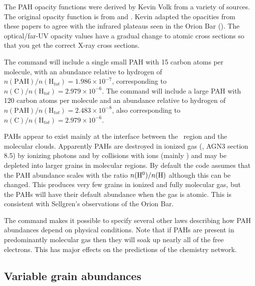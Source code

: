 The PAH opacity functions were derived by Kevin Volk
from a variety of sources.
The original opacity function is from \citet{Desert1990} and
\citet{Schutte1993}.
Kevin adapted the
opacities from these papers to agree with the infrared plateaus seen in
the Orion Bar (\citealp{Bregman1989}).
The optical/far-UV opacity values
have a gradual change to atomic cross sections so that you get the correct
X-ray cross sections.

The command  will include a
single small PAH with 15 carbon
atoms per molecule, with an abundance relative to hydrogen of
$n(
{{\mathrm{PAH}}})/n( {{\mathrm{H}}_{tot} } ) = 1.986 \times 10^{
- 7} $,
corresponding to
$n( {\mathrm{C}})/n( {{\mathrm{H}}_{tot}
} ) = 2.979 \times 10^{ - 6} $.
The command  will include
a large PAH with 120 carbon
atoms per molecule and an abundance relative to hydrogen of
$n(
{{\mathrm{PAH}}} )/n( {{\mathrm{H}}_{tot} } ) = 2.483 \times 10^{
- 8} $, also corresponding to $n( {\mathrm{C}} )/n( {{\mathrm{H}}_{tot}
} ) = 2.979 \times 10^{ - 6} $.

PAHs appear to exist mainly at the interface between
the \hplus\ region and the molecular clouds.
Apparently PAHs are destroyed in ionized gas (\citealp{Sellgren1990},
AGN3 section 8.5) by ionizing photons and by collisions with
ions (mainly \hplus) and may be depleted into larger grains in
molecular regions.
By default the code assumes that the PAH abundance scales with the ratio
$n( {\h0 })/n( {\mathrm{H}} )$ although this can be changed.
This produces very few grains in ionized and fully molecular gas,
but the PAHs will have their default abundance when the gas is atomic.
This is consistent with Sellgren's observations of the Orion Bar.

The  command
makes it possible to specify several other laws describing
how PAH abundances depend on physical conditions.
Note that if PAHs are present in predominantly molecular gas
then they will soak up nearly all of the free electrons.
This has major effects on the predictions of the chemistry network.

\subsection{Variable grain abundances}

